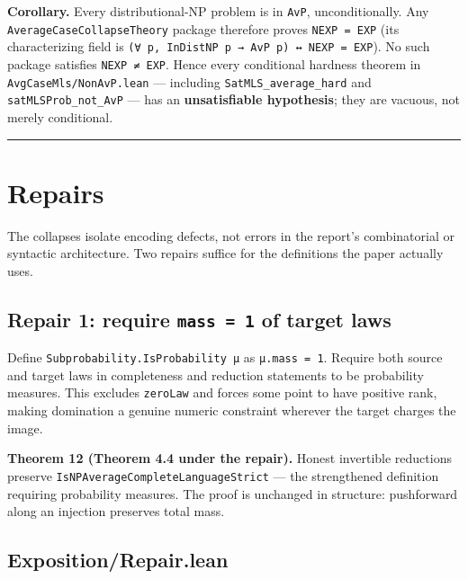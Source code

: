 \documentclass[11pt,a4paper]{article}
\begin{document}
\textbf{Corollary.} Every distributional-NP problem is in \texttt{AvP}, unconditionally. Any \texttt{AverageCaseCollapseTheory} package therefore proves \texttt{NEXP\ =\ EXP} (its characterizing field is \texttt{(∀\ p,\ InDistNP\ p\ →\ AvP\ p)\ ↔\ NEXP\ =\ EXP}). No such package satisfies \texttt{NEXP\ ≠\ EXP}. Hence every conditional hardness theorem in \texttt{AvgCaseMls/NonAvP.lean} --- including \texttt{SatMLS\_average\_hard} and \texttt{satMLSProb\_not\_AvP} --- has an \textbf{unsatisfiable hypothesis}; they are vacuous, not merely conditional.

\begin{center}\rule{0.5\linewidth}{0.5pt}\end{center}

\hypertarget{repairs}{%
\section{Repairs}\label{repairs}}

The collapses isolate encoding defects, not errors in the report's combinatorial or syntactic architecture. Two repairs suffice for the definitions the paper actually uses.

\hypertarget{repair-1-require-mass-1-of-target-laws}{%
\subsection{\texorpdfstring{Repair 1: require \texttt{mass\ =\ 1} of target laws}{Repair 1: require mass = 1 of target laws}}\label{repair-1-require-mass-1-of-target-laws}}

Define \texttt{Subprobability.IsProbability\ μ} as \texttt{μ.mass\ =\ 1}. Require both source and target laws in completeness and reduction statements to be probability measures. This excludes \texttt{zeroLaw} and forces some point to have positive rank, making domination a genuine numeric constraint wherever the target charges the image.

\textbf{Theorem 12 (Theorem 4.4 under the repair).} Honest invertible reductions preserve \texttt{IsNPAverageCompleteLanguageStrict} --- the strengthened definition requiring probability measures. The proof is unchanged in structure: pushforward along an injection preserves total mass.

\hypertarget{exposition-repair-lean}{%
\subsection{Exposition/Repair.lean}\label{exposition-repair-lean}}
\end{document}
